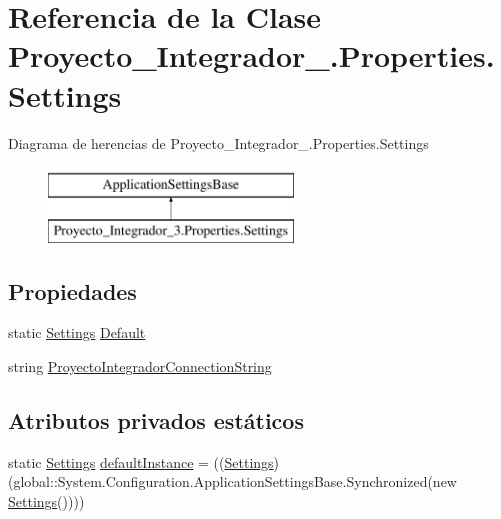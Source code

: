 \hypertarget{class_proyecto___integrador__3_1_1_properties_1_1_settings}{\section{Referencia de la Clase Proyecto\-\_\-\-Integrador\-\_.\-Properties.\-Settings}
\label{class_proyecto___integrador__3_1_1_properties_1_1_settings}
}
Diagrama de herencias de Proyecto\-\_\-\-Integrador\-\_.\-Properties.\-Settings\begin{figure}[H]
\begin{center}
\leavevmode
\includegraphics[height=2.000000cm]{d2/dc9/class_proyecto___integrador__3_1_1_properties_1_1_settings}
\end{center}
\end{figure}
\subsection*{Propiedades}
\begin{DoxyCompactItemize}
\item 
static \hyperlink{class_proyecto___integrador__3_1_1_properties_1_1_settings}{Settings} \hyperlink{class_proyecto___integrador__3_1_1_properties_1_1_settings_ac74497e82c6360793c1eb24ddce6e7b1}{Default}
\item 
string \hyperlink{class_proyecto___integrador__3_1_1_properties_1_1_settings_a93d1b331cecd6df496d20e46ec32450d}{Proyecto\-Integrador\-Connection\-String}
\end{DoxyCompactItemize}
\subsection*{Atributos privados estáticos}
\begin{DoxyCompactItemize}
\item 
static \hyperlink{class_proyecto___integrador__3_1_1_properties_1_1_settings}{Settings} \hyperlink{class_proyecto___integrador__3_1_1_properties_1_1_settings_a0506f261ec13f63859843f202056c917}{default\-Instance} = ((\hyperlink{class_proyecto___integrador__3_1_1_properties_1_1_settings}{Settings})(global\-::\-System.\-Configuration.\-Application\-Settings\-Base.\-Synchronized(new \hyperlink{class_proyecto___integrador__3_1_1_properties_1_1_settings}{Settings}())))
\end{DoxyCompactItemize}


